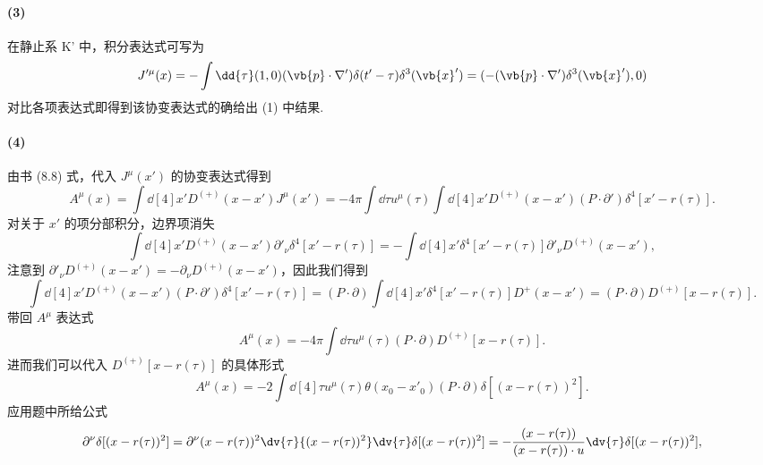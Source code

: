 \documentclass[12pt]{article}
\begin{document}
\paragraph{(3)}
在静止系 K' 中，积分表达式可写为
\begin{equation*}
  J'^{\mu}(x) = -\int \dd{\tau} (1, 0) (\vb{p} \cdot \nabla') \delta(t' - \tau) \delta^3(\vb{x}') = (-(\vb{p} \cdot \nabla') \delta^3(\vb{x}'), 0) 
\end{equation*}
对比各项表达式即得到该协变表达式的确给出 (1) 中结果.

\paragraph{(4)}
由书 (8.8) 式，代入 $J^{\mu}(x')$ 的协变表达式得到
\begin{equation*}
  A^{\mu}(x) = \int \dd[4]{x'} D^{(+)}(x - x') J^{\mu}(x') = -4\pi \int \dd{\tau} u^{\mu}(\tau) \int \dd[4]{x'} D^{(+)}(x - x') (P \cdot \partial') \delta^4[x' - r(\tau)].
\end{equation*}
对关于 $x'$ 的项分部积分，边界项消失
\begin{equation*}
  \int \dd[4]{x'} D^{(+)}(x - x') \partial'_{\nu} \delta^4[x' - r(\tau)] = -\int \dd[4]{x'} \delta^4[x' - r(\tau)] \partial'_{\nu} D^{(+)}(x - x'),
\end{equation*}
注意到 $\partial'_{\nu} D^{(+)}(x - x') = - \partial_{\nu} D^{(+)}(x - x')$，因此我们得到
\begin{equation*}
  \int \dd[4]{x'} D^{(+)}(x - x') (P \cdot \partial') \delta^4[x' - r(\tau)] = (P \cdot \partial) \int \dd[4]{x'} \delta^4[x' - r(\tau)] D^{+}(x - x') = (P \cdot \partial) D^{(+)}[x - r(\tau)].
\end{equation*}
带回 $A^{\mu}$ 表达式
\begin{equation*}
  A^{\mu}(x) = -4\pi \int \dd{\tau} u^{\mu}(\tau) (P \cdot \partial) D^{(+)}[x - r(\tau)].
\end{equation*}
进而我们可以代入 $D^{(+)}[x - r(\tau)]$ 的具体形式
\begin{equation*}
  A^{\mu}(x) = -2 \int \dd[4]{\tau} u^{\mu}(\tau) \theta(x_0 - x'_0) (P \cdot \partial) \delta[(x - r(\tau))^2].
\end{equation*}
应用题中所给公式
\begin{equation*}
  \partial^{\nu} \delta[(x - r(\tau))^2] = \partial^{\nu} (x - r(\tau))^2 \dv{\tau}{(x - r(\tau))^2} \dv{\tau} \delta[(x - r(\tau))^2] = -\frac{(x - r(\tau))}{(x - r(\tau)) \cdot u} \dv{\tau} \delta[(x - r(\tau))^2],
\end{equation*}
\end{document}
